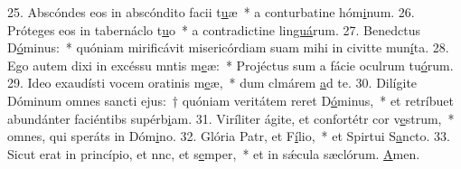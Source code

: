 25. Abscóndes eos in abscóndito facii t\uline{u}æ~* a conturbatine hóm\uline{i}num.
26. Próteges eos in tabernáclo t\uline{u}o~* a contradictine lin\uline{guá}rum.
27. Benedctus D\uline{ó}minus:~* quóniam mirificávit misericórdiam suam mihi in civitte mun\uline{í}ta.
28. Ego autem dixi in excéssu mntis m\uline{e}æ:~* Projéctus sum a fácie oculrum tu\uline{ó}rum.
29. Ideo exaudísti vocem oratinis m\uline{e}æ,~* dum clmárem \uline{a}d te.
30. Dilígite Dóminum omnes sancti ejus:~† quóniam veritátem reret D\uline{ó}minus,~* et retríbuet abundánter faciéntibs supérb\uline{i}am.
31. Viríliter ágite, et confortétr cor v\uline{e}strum,~* omnes, qui speráts in Dóm\uline{i}no.
32. Glória Patr, et F\uline{í}lio,~* et Spirtui S\uline{a}ncto.
33. Sicut erat in princípio, et nnc, et s\uline{e}mper,~* et in sǽcula sæclórum. \uline{A}men.
